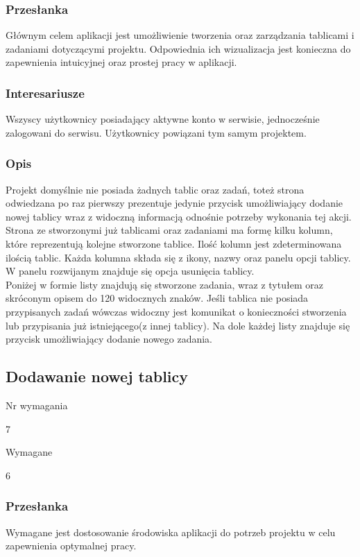 \documentclass[eng,printmode]{mgr}
\begin{document}
\subsubsection{Przesłanka}
Głównym celem aplikacji jest umożliwienie tworzenia oraz zarządzania tablicami i zadaniami dotyczącymi projektu. Odpowiednia ich wizualizacja jest konieczna do zapewnienia intuicyjnej oraz prostej pracy w aplikacji.

\subsubsection{Interesariusze}
Wszyscy użytkownicy posiadający aktywne konto w serwisie, jednocześnie zalogowani do serwisu. Użytkownicy powiązani tym samym projektem.

\subsubsection{Opis}
Projekt domyślnie nie posiada żadnych tablic oraz zadań, toteż strona odwiedzana po raz pierwszy prezentuje jedynie przycisk umożliwiający dodanie nowej tablicy wraz z widoczną informacją odnośnie potrzeby wykonania tej akcji. \\
Strona ze stworzonymi już tablicami oraz zadaniami ma formę kilku kolumn, które reprezentują kolejne stworzone tablice. Ilość kolumn jest zdeterminowana ilością tablic. Każda kolumna składa się z ikony, nazwy oraz panelu opcji tablicy. W panelu rozwijanym znajduje się opcja usunięcia tablicy. \\
Poniżej w formie listy znajdują się stworzone zadania, wraz z tytułem oraz skróconym opisem do 120 widocznych znaków. Jeśli tablica nie posiada przypisanych zadań wówczas widoczny jest komunikat o konieczności stworzenia lub przypisania już istniejącego(z innej tablicy). Na dole każdej listy znajduje się przycisk umożliwiający dodanie nowego zadania.
\newpage

\subsection{Dodawanie nowej tablicy}
\begin{labeling}{Nr wymagania}
\item [Nr wymagania:] 7
\item [Priorytet:] Wymagane
\item [Powiązania:] 6
\end{labeling}

\subsubsection{Przesłanka}
Wymagane jest dostosowanie środowiska aplikacji do potrzeb projektu w celu zapewnienia optymalnej pracy.
\end{document}
